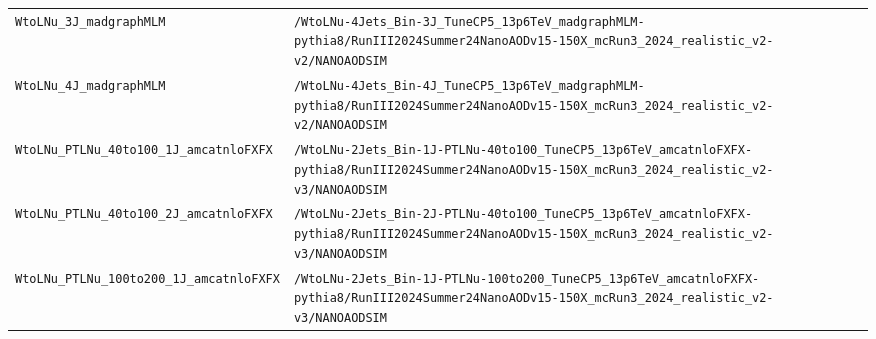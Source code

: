 \begin{longtable}{@{}>{\RaggedRight\arraybackslash}p{} >{\RaggedRight\arraybackslash}p{}@{}}
\addlinespace[2pt]
\texttt{WtoLNu\_\allowbreak{}3J\_\allowbreak{}madgraphMLM} & \texttt{/\allowbreak{}WtoLNu-\allowbreak{}4Jets\_\allowbreak{}Bin-\allowbreak{}3J\_\allowbreak{}TuneCP5\_\allowbreak{}13p6TeV\_\allowbreak{}madgraphMLM-\allowbreak{}pythia8/\allowbreak{}RunIII2024Summer24NanoAODv15-\allowbreak{}150X\_\allowbreak{}mcRun3\_\allowbreak{}2024\_\allowbreak{}realistic\_\allowbreak{}v2-\allowbreak{}v2/\allowbreak{}NANOAODSIM} \\
\addlinespace[2pt]
\texttt{WtoLNu\_\allowbreak{}4J\_\allowbreak{}madgraphMLM} & \texttt{/\allowbreak{}WtoLNu-\allowbreak{}4Jets\_\allowbreak{}Bin-\allowbreak{}4J\_\allowbreak{}TuneCP5\_\allowbreak{}13p6TeV\_\allowbreak{}madgraphMLM-\allowbreak{}pythia8/\allowbreak{}RunIII2024Summer24NanoAODv15-\allowbreak{}150X\_\allowbreak{}mcRun3\_\allowbreak{}2024\_\allowbreak{}realistic\_\allowbreak{}v2-\allowbreak{}v2/\allowbreak{}NANOAODSIM} \\
\addlinespace[2pt]
\texttt{WtoLNu\_\allowbreak{}PTLNu\_\allowbreak{}40to100\_\allowbreak{}1J\_\allowbreak{}amcatnloFXFX} & \texttt{/\allowbreak{}WtoLNu-\allowbreak{}2Jets\_\allowbreak{}Bin-\allowbreak{}1J-\allowbreak{}PTLNu-\allowbreak{}40to100\_\allowbreak{}TuneCP5\_\allowbreak{}13p6TeV\_\allowbreak{}amcatnloFXFX-\allowbreak{}pythia8/\allowbreak{}RunIII2024Summer24NanoAODv15-\allowbreak{}150X\_\allowbreak{}mcRun3\_\allowbreak{}2024\_\allowbreak{}realistic\_\allowbreak{}v2-\allowbreak{}v3/\allowbreak{}NANOAODSIM} \\
\addlinespace[2pt]
\texttt{WtoLNu\_\allowbreak{}PTLNu\_\allowbreak{}40to100\_\allowbreak{}2J\_\allowbreak{}amcatnloFXFX} & \texttt{/\allowbreak{}WtoLNu-\allowbreak{}2Jets\_\allowbreak{}Bin-\allowbreak{}2J-\allowbreak{}PTLNu-\allowbreak{}40to100\_\allowbreak{}TuneCP5\_\allowbreak{}13p6TeV\_\allowbreak{}amcatnloFXFX-\allowbreak{}pythia8/\allowbreak{}RunIII2024Summer24NanoAODv15-\allowbreak{}150X\_\allowbreak{}mcRun3\_\allowbreak{}2024\_\allowbreak{}realistic\_\allowbreak{}v2-\allowbreak{}v3/\allowbreak{}NANOAODSIM} \\
\addlinespace[2pt]
\texttt{WtoLNu\_\allowbreak{}PTLNu\_\allowbreak{}100to200\_\allowbreak{}1J\_\allowbreak{}amcatnloFXFX} & \texttt{/\allowbreak{}WtoLNu-\allowbreak{}2Jets\_\allowbreak{}Bin-\allowbreak{}1J-\allowbreak{}PTLNu-\allowbreak{}100to200\_\allowbreak{}TuneCP5\_\allowbreak{}13p6TeV\_\allowbreak{}amcatnloFXFX-\allowbreak{}pythia8/\allowbreak{}RunIII2024Summer24NanoAODv15-\allowbreak{}150X\_\allowbreak{}mcRun3\_\allowbreak{}2024\_\allowbreak{}realistic\_\allowbreak{}v2-\allowbreak{}v3/\allowbreak{}NANOAODSIM} \\

\end{longtable}

